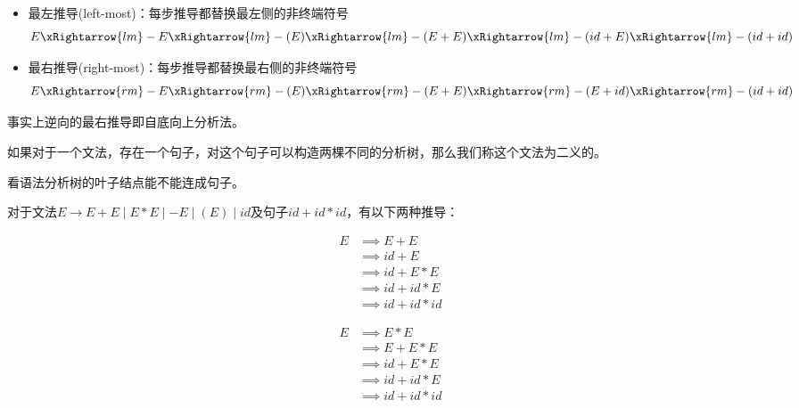 \begin{itemize}
	\item 最左推导(left-most)：每步推导都替换最左侧的非终端符号
	\[E\xRightarrow{lm}
	-E\xRightarrow{lm}
	-(E)\xRightarrow{lm}
	-(E+E)\xRightarrow{lm}
	-(id+E)\xRightarrow{lm}
	-(id+id)\]
	\item 最右推导(right-most)：每步推导都替换最右侧的非终端符号
	\[E\xRightarrow{rm}
	-E\xRightarrow{rm}
	-(E)\xRightarrow{rm}
	-(E+E)\xRightarrow{rm}
	-(E+id)\xRightarrow{rm}
	-(id+id)\]
\end{itemize}

事实上逆向的最右推导即自底向上分析法。

\begin{definition}[二义性]
如果对于一个文法，存在一个句子，对这个句子可以构造两棵不同的分析树，那么我们称这个文法为二义的。
\end{definition}
看语法分析树的叶子结点能不能连成句子。

\begin{example}
对于文法$E\to E+E\mid E*E\mid -E\mid (E)\mid id$及句子$id+id*id$，有以下两种推导：

\begin{minipage}{0.5\linewidth}
\[\begin{aligned}
E &\implies E+E\\
&\implies id+E\\
&\implies id+E*E\\
&\implies id+id*E\\
&\implies id+id*id
\end{aligned}\]
\end{minipage}
\begin{minipage}{0.5\linewidth}
\[\begin{aligned}
E &\implies E*E\\
&\implies E+E*E\\
&\implies id+E*E\\
&\implies id+id*E\\
&\implies id+id*id
\end{aligned}\]
\end{minipage}
\end{example}

